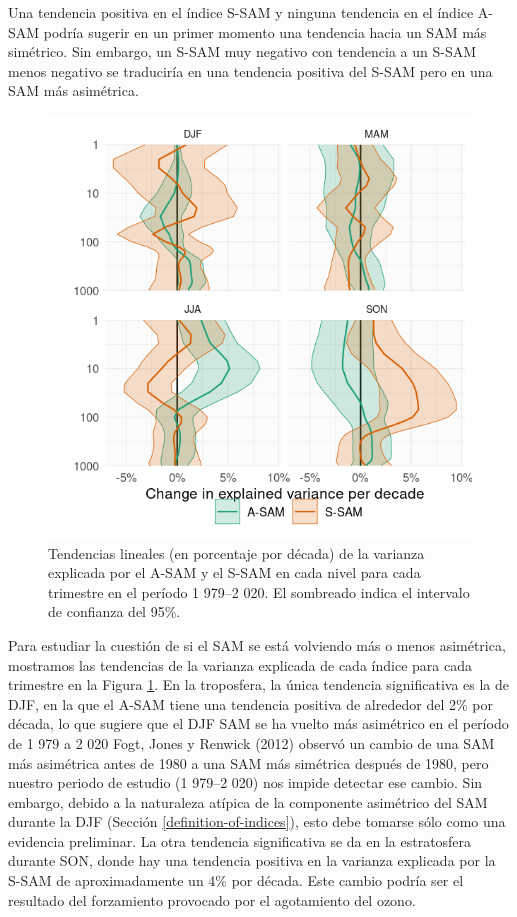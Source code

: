 \documentclass[12pt,oneside,a4paper]{reedthesis}
\begin{document}
Una tendencia positiva en el índice S-SAM y ninguna tendencia en el índice A-SAM podría sugerir en un primer momento una tendencia hacia un SAM más simétrico.
Sin embargo, un S-SAM muy negativo con tendencia a un S-SAM menos negativo se traduciría en una tendencia positiva del S-SAM pero en una SAM más asimétrica.



\begin{figure}

{\centering \includegraphics{figures/30-sam/r-squared-trend-1} 

}

\caption{Tendencias lineales (en porcentaje por década) de la varianza explicada por el A-SAM y el S-SAM en cada nivel para cada trimestre en el período 1 979--2 020. El sombreado indica el intervalo de confianza del 95\%.}\label{fig:r-squared-trend}
\end{figure}

Para estudiar la cuestión de si el SAM se está volviendo más o menos asimétrica, mostramos las tendencias de la varianza explicada de cada índice para cada trimestre en la Figura \ref{fig:r-squared-trend}.
En la troposfera, la única tendencia significativa es la de DJF, en la que el A-SAM tiene una tendencia positiva de alrededor del 2\% por década, lo que sugiere que el DJF SAM se ha vuelto más asimétrico en el período de 1 979 a 2 020 Fogt, Jones y Renwick (2012) observó un cambio de una SAM más asimétrica antes de 1980 a una SAM más simétrica después de 1980, pero nuestro periodo de estudio (1 979--2 020) nos impide detectar ese cambio.
Sin embargo, debido a la naturaleza atípica de la componente asimétrico del SAM durante la DJF (Sección \ref{definition-of-indices}), esto debe tomarse sólo como una evidencia preliminar.
La otra tendencia significativa se da en la estratosfera durante SON, donde hay una tendencia positiva en la varianza explicada por la S-SAM de aproximadamente un 4\% por década.
Este cambio podría ser el resultado del forzamiento provocado por el agotamiento del ozono.
\end{document}
